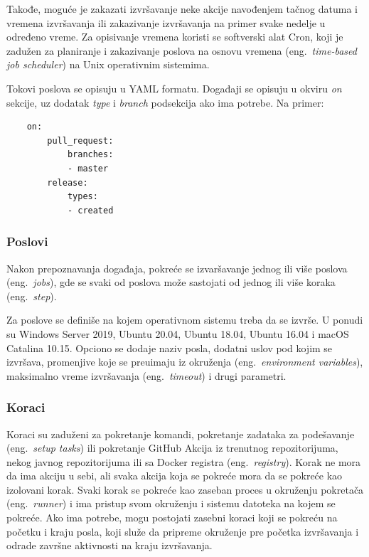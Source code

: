 \documentclass[12pt]{report}
\begin{document}
Takođe, moguće je zakazati izvršavanje neke akcije navođenjem tačnog datuma i vremena izvršavanja ili zakazivanje izvršavanja na primer svake nedelje u određeno vreme. Za opisivanje vremena koristi se softverski alat Cron, koji je zadužen za planiranje i zakazivanje poslova na osnovu vremena (eng.\ \textit{time-based job scheduler}) na Unix operativnim sistemima.

Tokovi poslova se opisuju u YAML formatu. Događaji se opisuju u okviru \textit{on} sekcije, uz dodatak \textit{type} i \textit{branch} podsekcija ako ima potrebe. Na primer:

\begin{samepage}
    \begin{verbatim}
    on:
        pull_request:
            branches:
            - master
        release:
            types:
            - created
    \end{verbatim}
\end{samepage}

\subsubsection{Poslovi}

Nakon prepoznavanja događaja, pokreće se izvaršavanje jednog ili više poslova (eng.\ \textit{jobs}), gde se svaki od poslova može sastojati od jednog ili više koraka (eng.\ \textit{step}).

Za poslove se definiše na kojem operativnom sistemu treba da se izvrše. U ponudi su Windows Server 2019, Ubuntu 20.04, Ubuntu 18.04, Ubuntu 16.04 i macOS Catalina 10.15. Opciono se dodaje naziv posla, dodatni uslov pod kojim se izvršava, promenjive koje se preuimaju iz okruženja (eng.\ \textit{environment variables}), maksimalno vreme izvršavanja (eng.\ \textit{timeout}) i drugi parametri.

\subsubsection{Koraci}

Koraci su zaduženi za pokretanje komandi, pokretanje zadataka za podešavanje (eng.\ \textit{setup tasks}) ili pokretanje GitHub Akcija iz trenutnog repozitorijuma, nekog javnog repozitorijuma ili sa Docker registra (eng.\ \textit{registry}). Korak ne mora da ima akciju u sebi, ali svaka akcija koja se pokreće mora da se pokreće kao izolovani korak. Svaki korak se pokreće kao zaseban proces u okruženju pokretača (eng.\ \textit{runner}) i ima pristup svom okruženju i sistemu datoteka na kojem se pokreće. Ako ima potrebe, mogu postojati zasebni koraci koji se pokreću na početku i kraju posla, koji služe da pripreme okruženje pre početka izvršavanja i odrade završne aktivnosti na kraju izvršavanja.
\end{document}
